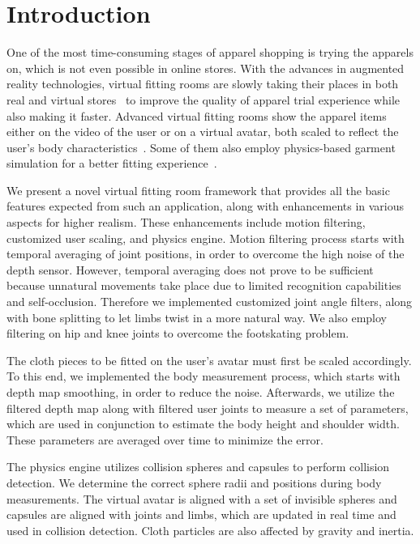 \documentclass[number,preprint,review,12pt]{elsarticle}
\begin{document}
\singlespacing

\doublespacing

\pagebreak

\section{Introduction}
\label{sec:Introduction}
One of the most time-consuming stages of apparel shopping is trying the apparels on, which is not even possible in online stores. With the advances in augmented reality technologies, virtual fitting rooms are slowly taking their places in both real and virtual stores~\cite{Fitnect2012,Styku2013} to improve the quality of apparel trial experience while also making it faster.
Advanced virtual fitting rooms show the apparel items either on the video of the user or on a virtual avatar, both scaled to reflect the user's body characteristics~\cite{FaceCake2013}. Some of them also employ physics-based garment simulation for a better fitting experience~\cite{Styku2013}.

We present a novel virtual fitting room framework that provides all the basic features expected from such an application, along with enhancements in various aspects for higher realism. These enhancements include motion filtering, customized user scaling, and physics engine. Motion filtering process starts with temporal averaging of joint positions,
in order to overcome the high noise of the depth sensor. However, temporal averaging does not prove to be sufficient because unnatural movements take place due to limited recognition capabilities and self-occlusion. Therefore we implemented customized joint angle filters, along with bone splitting to let limbs twist in a more natural way. We also employ filtering on hip and knee joints to overcome the footskating problem.

The cloth pieces to be fitted on the user's avatar must first be scaled accordingly. To this end, we implemented the body measurement process, which starts with depth map smoothing, in order to reduce the noise. Afterwards, we utilize the filtered depth map along with filtered user joints to measure a set of parameters, which are used in conjunction to estimate the body height and shoulder width. These parameters are averaged over time to minimize the error.

The physics engine utilizes collision spheres and capsules to perform collision detection. We determine the correct sphere radii and positions during body measurements. The virtual avatar is aligned with a set of invisible spheres and capsules are aligned with joints and limbs, which are updated in real time and used in collision detection. Cloth particles are also affected by gravity and inertia.
\end{document}
